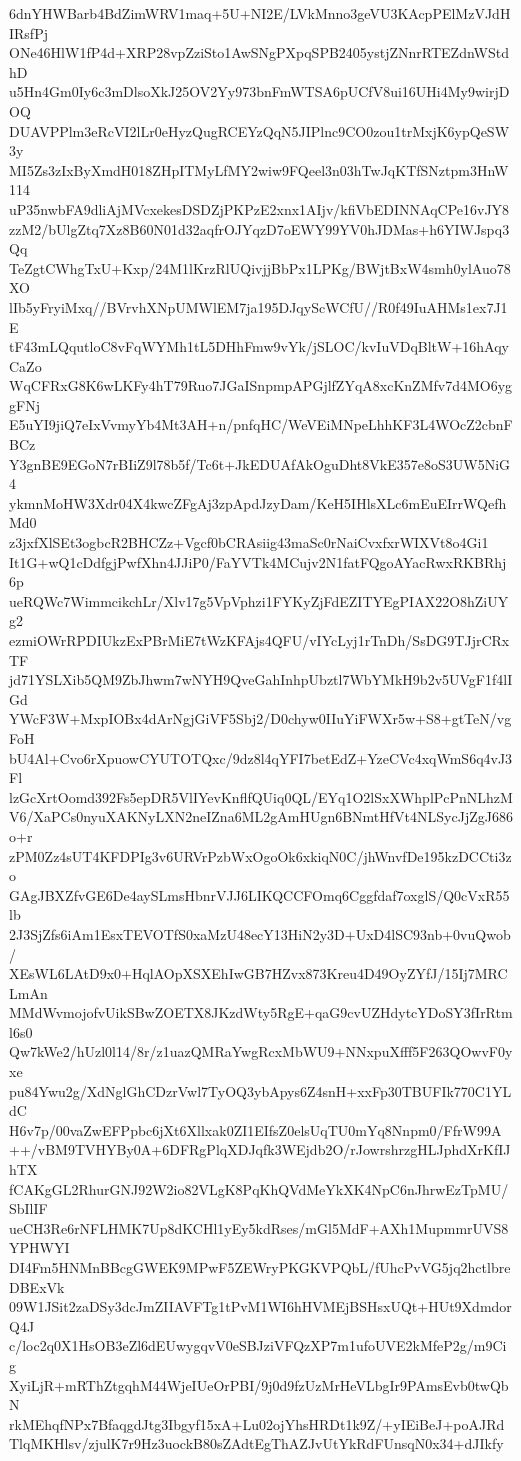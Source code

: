 6dnYHWBarb4BdZimWRV1maq+5U+NI2E/LVkMnno3geVU3KAcpPElMzVJdHIRsfPj
ONe46HlW1fP4d+XRP28vpZziSto1AwSNgPXpqSPB2405ystjZNnrRTEZdnWStdhD
u5Hn4Gm0Iy6c3mDlsoXkJ25OV2Yy973bnFmWTSA6pUCfV8ui16UHi4My9wirjDOQ
DUAVPPlm3eRcVI2lLr0eHyzQugRCEYzQqN5JIPlnc9CO0zou1trMxjK6ypQeSW3y
MI5Zs3zIxByXmdH018ZHpITMyLfMY2wiw9FQeel3n03hTwJqKTfSNztpm3HnW114
uP35nwbFA9dliAjMVcxekesDSDZjPKPzE2xnx1AIjv/kfiVbEDINNAqCPe16vJY8
zzM2/bUlgZtq7Xz8B60N01d32aqfrOJYqzD7oEWY99YV0hJDMas+h6YIWJspq3Qq
TeZgtCWhgTxU+Kxp/24M1lKrzRlUQivjjBbPx1LPKg/BWjtBxW4smh0ylAuo78XO
lIb5yFryiMxq//BVrvhXNpUMWlEM7ja195DJqyScWCfU//R0f49IuAHMs1ex7J1E
tF43mLQqutloC8vFqWYMh1tL5DHhFmw9vYk/jSLOC/kvIuVDqBltW+16hAqyCaZo
WqCFRxG8K6wLKFy4hT79Ruo7JGaISnpmpAPGjlfZYqA8xcKnZMfv7d4MO6yggFNj
E5uYI9jiQ7eIxVvmyYb4Mt3AH+n/pnfqHC/WeVEiMNpeLhhKF3L4WOcZ2cbnFBCz
Y3gnBE9EGoN7rBIiZ9l78b5f/Tc6t+JkEDUAfAkOguDht8VkE357e8oS3UW5NiG4
ykmnMoHW3Xdr04X4kwcZFgAj3zpApdJzyDam/KeH5IHlsXLc6mEuEIrrWQefhMd0
z3jxfXlSEt3ogbcR2BHCZz+Vgcf0bCRAsiig43maSc0rNaiCvxfxrWIXVt8o4Gi1
It1G+wQ1cDdfgjPwfXhn4JJiP0/FaYVTk4MCujv2N1fatFQgoAYacRwxRKBRhj6p
ueRQWc7WimmcikchLr/Xlv17g5VpVphzi1FYKyZjFdEZITYEgPIAX22O8hZiUYg2
ezmiOWrRPDIUkzExPBrMiE7tWzKFAjs4QFU/vIYcLyj1rTnDh/SsDG9TJjrCRxTF
jd71YSLXib5QM9ZbJhwm7wNYH9QveGahInhpUbztl7WbYMkH9b2v5UVgF1f4lIGd
YWcF3W+MxpIOBx4dArNgjGiVF5Sbj2/D0chyw0IIuYiFWXr5w+S8+gtTeN/vgFoH
bU4Al+Cvo6rXpuowCYUTOTQxc/9dz8l4qYFI7betEdZ+YzeCVc4xqWmS6q4vJ3Fl
lzGcXrtOomd392Fs5epDR5VlIYevKnflfQUiq0QL/EYq1O2lSxXWhplPcPnNLhzM
V6/XaPCs0nyuXAKNyLXN2neIZna6ML2gAmHUgn6BNmtHfVt4NLSycJjZgJ686o+r
zPM0Zz4sUT4KFDPIg3v6URVrPzbWxOgoOk6xkiqN0C/jhWnvfDe195kzDCCti3zo
GAgJBXZfvGE6De4aySLmsHbnrVJJ6LIKQCCFOmq6Cggfdaf7oxglS/Q0cVxR55lb
2J3SjZfs6iAm1EsxTEVOTfS0xaMzU48ecY13HiN2y3D+UxD4lSC93nb+0vuQwob/
XEsWL6LAtD9x0+HqlAOpXSXEhIwGB7HZvx873Kreu4D49OyZYfJ/15Ij7MRCLmAn
MMdWvmojofvUikSBwZOETX8JKzdWty5RgE+qaG9cvUZHdytcYDoSY3fIrRtml6s0
Qw7kWe2/hUzl0l14/8r/z1uazQMRaYwgRcxMbWU9+NNxpuXfff5F263QOwvF0yxe
pu84Ywu2g/XdNglGhCDzrVwl7TyOQ3ybApys6Z4snH+xxFp30TBUFIk770C1YLdC
H6v7p/00vaZwEFPpbc6jXt6Xllxak0ZI1EIfsZ0elsUqTU0mYq8Nnpm0/FfrW99A
++/vBM9TVHYBy0A+6DFRgPlqXDJqfk3WEjdb2O/rJowrshrzgHLJphdXrKfIJhTX
fCAKgGL2RhurGNJ92W2io82VLgK8PqKhQVdMeYkXK4NpC6nJhrwEzTpMU/SbIlIF
ueCH3Re6rNFLHMK7Up8dKCHl1yEy5kdRses/mGl5MdF+AXh1MupmmrUVS8YPHWYI
DI4Fm5HNMnBBcgGWEK9MPwF5ZEWryPKGKVPQbL/fUhcPvVG5jq2hctlbreDBExVk
09W1JSit2zaDSy3dcJmZIIAVFTg1tPvM1WI6hHVMEjBSHsxUQt+HUt9XdmdorQ4J
c/loc2q0X1HsOB3eZl6dEUwygqvV0eSBJziVFQzXP7m1ufoUVE2kMfeP2g/m9Cig
XyiLjR+mRThZtgqhM44WjeIUeOrPBI/9j0d9fzUzMrHeVLbgIr9PAmsEvb0twQbN
rkMEhqfNPx7BfaqgdJtg3Ibgyf15xA+Lu02ojYhsHRDt1k9Z/+yIEiBeJ+poAJRd
TlqMKHlsv/zjulK7r9Hz3uockB80sZAdtEgThAZJvUtYkRdFUnsqN0x34+dJIkfy
